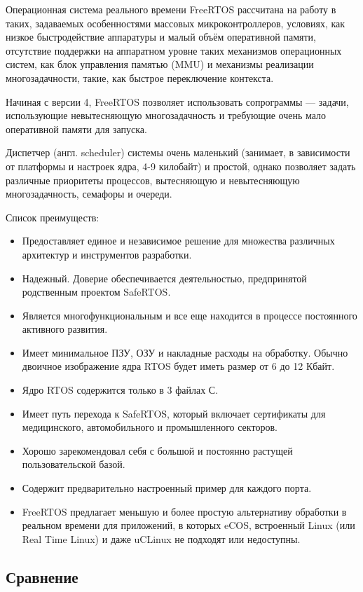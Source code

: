 \documentclass[a4paper,12pt]{article}
\begin{document}
Операционная система реального времени FreeRTOS рассчитана на работу в таких, задаваемых особенностями массовых микроконтроллеров, условиях, как низкое быстродействие аппаратуры и малый объём оперативной памяти, отсутствие поддержки на аппаратном уровне таких механизмов операционных систем, как блок управления памятью (MMU) и механизмы реализации многозадачности, такие, как быстрое переключение контекста.

Начиная с версии 4, FreeRTOS позволяет использовать сопрограммы — задачи, использующие невытесняющую многозадачность и требующие очень мало оперативной памяти для запуска.

Диспетчер (англ. scheduler) системы очень маленький (занимает, в зависимости от платформы и настроек ядра, 4-9 килобайт) и простой, однако позволяет задать различные приоритеты процессов, вытесняющую и невытесняющую многозадачность, семафоры и очереди.

Список преимуществ:
\begin{itemize}
    \item Предоставляет единое и независимое решение для множества различных архитектур и инструментов разработки.
    \item Надежный. Доверие обеспечивается деятельностью, предпринятой родственным проектом SafeRTOS.
    \item Является многофункциональным и все еще находится в процессе постоянного активного развития.
    \item Имеет минимальное ПЗУ, ОЗУ и накладные расходы на обработку. Обычно двоичное изображение ядра RTOS будет иметь размер от 6 до 12 Кбайт.
    \item Ядро RTOS содержится только в 3 файлах С. 
    \item Имеет путь перехода к SafeRTOS, который включает сертификаты для медицинского, автомобильного и промышленного секторов.
    \item Хорошо зарекомендовал себя с большой и постоянно растущей пользовательской базой.
    \item Содержит предварительно настроенный пример для каждого порта.
    \item FreeRTOS предлагает меньшую и более простую альтернативу обработки в реальном времени для приложений, в которых eCOS, встроенный Linux (или Real Time Linux) и даже uCLinux не подходят или недоступны.
\end{itemize}

\subsection{Сравнение}
\end{document}
